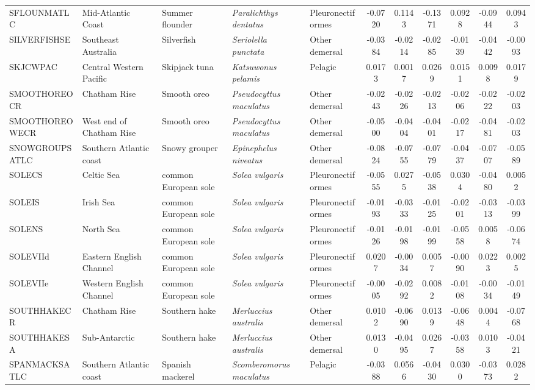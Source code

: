 \begin{longtable}{p{3cm}p{3cm}lllcccccc}
  SFLOUNMATLC & Mid-Atlantic Coast & Summer flounder & \textit{Paralichthys dentatus} & Pleuronectiformes & -0.0720 & 0.1143 & -0.1371 & 0.0928 & -0.0944 & 0.0943 \\
  SILVERFISHSE & Southeast Australia & Silverfish & \textit{Seriolella punctata} & Other demersal & -0.0384 & -0.0214 & -0.0285 & -0.0139 & -0.0442 & -0.0093 \\
  SKJCWPAC & Central Western Pacific & Skipjack tuna & \textit{Katsuwonus pelamis} & Pelagic & 0.0173 & 0.0017 & 0.0269 & 0.0151 & 0.0098 & 0.0179 \\
  SMOOTHOREOCR & Chatham Rise & Smooth oreo & \textit{Pseudocyttus maculatus} & Other demersal & -0.0243 & -0.0226 & -0.0213 & -0.0206 & -0.0222 & -0.0203 \\
  SMOOTHOREOWECR & West end of Chatham Rise & Smooth oreo & \textit{Pseudocyttus maculatus} & Other demersal & -0.0500 & -0.0404 & -0.0401 & -0.0217 & -0.0481 & -0.0203 \\
  SNOWGROUPSATLC & Southern Atlantic coast & Snowy grouper & \textit{Epinephelus niveatus} & Other demersal & -0.0824 & -0.0755 & -0.0779 & -0.0437 & -0.0707 & -0.0589 \\
  SOLECS & Celtic Sea & common European sole & \textit{Solea vulgaris} & Pleuronectiformes & -0.0555 & 0.0275 & -0.0538 & 0.0304 & -0.0480 & 0.0052 \\
  SOLEIS & Irish Sea & common European sole & \textit{Solea vulgaris} & Pleuronectiformes & -0.0193 & -0.0333 & -0.0125 & -0.0201 & -0.0313 & -0.0399 \\
  SOLENS & North Sea & common European sole & \textit{Solea vulgaris} & Pleuronectiformes & -0.0126 & -0.0198 & -0.0199 & -0.0558 & 0.0058 & -0.0674 \\
  SOLEVIId & Eastern English Channel & common European sole & \textit{Solea vulgaris} & Pleuronectiformes & 0.0207 & -0.0034 & 0.0057 & -0.0090 & 0.0223 & 0.0025 \\
  SOLEVIIe & Western English Channel & common European sole & \textit{Solea vulgaris} & Pleuronectiformes & -0.0005 & -0.0292 & 0.0082 & -0.0108 & -0.0034 & -0.0149 \\
  SOUTHHAKECR & Chatham Rise & Southern hake & \textit{Merluccius australis} & Other demersal & 0.0102 & -0.0690 & 0.0139 & -0.0648 & 0.0044 & -0.0768 \\
  SOUTHHAKESA & Sub-Antarctic & Southern hake & \textit{Merluccius australis} & Other demersal & 0.0130 & -0.0495 & 0.0267 & -0.0358 & 0.0103 & -0.0421 \\
  SPANMACKSATLC & Southern Atlantic coast & Spanish mackerel & \textit{Scomberomorus maculatus} & Pelagic & -0.0388 & 0.0566 & -0.0430 & 0.0300 & -0.0373 & 0.0282 \\

\end{longtable}
